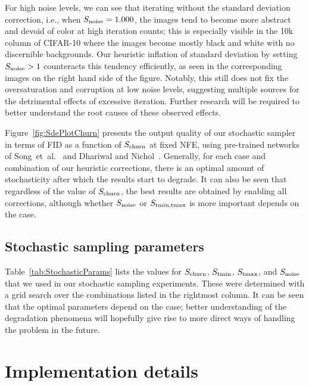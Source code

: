 For high noise levels, we can see that iterating without the standard deviation correction, i.e., when $S_\text{noise}=1.000$, the images tend to become more abstract and devoid of color at high iteration counts;
  this is especially visible in the 10k column of CIFAR-10 where the images become mostly black and white with no discernible backgrounds.
Our heuristic inflation of standard deviation by setting $S_\text{noise} > 1$ counteracts this tendency efficiently, as seen in the corresponding images on the right hand side of the figure.
Notably, this still does not fix the oversaturation and corruption at low noise levels, suggesting multiple sources for the detrimental effects of excessive iteration.
Further research will be required to better understand the root causes of these observed effects.

\figSdePlotChurn

Figure~\ref{fig:SdePlotChurn} presents the output quality of our stochastic sampler in terms of FID as a function of $S_\text{churn}$ at fixed NFE,
  using pre-trained networks of Song~et~al.~\cite{Song2021sde} and Dhariwal and Nichol~\cite{Dhariwal2021}.
Generally, for each case and combination of our heuristic corrections, there is an optimal amount of stochasticity after which the results start to degrade.
It can also be seen that regardless of the value of $S_\text{churn}$, the best results are obtained by enabling all corrections, although whether $S_\text{noise}$ or $S_\text{tmin,tmax}$ is more important depends on the case.

\subsection{\texorpdfstring{{Stochastic sampling parameters}}{Stochastic sampling parameters}}
\label{app:stochasticparams}

\tabStochasticParams

Table~\ref{tab:StochasticParams} lists {the values for $S_\text{churn}$, $S_\text{tmin}$, $S_\text{tmax}$, and $S_\text{noise}$ that we used in our stochastic sampling experiments}.
These were determined with a grid search over the combinations listed in the rightmost column.
It can be seen that the optimal parameters depend on the case;
  better understanding of the degradation phenomena will hopefully give rise to more direct ways of handling the problem in the future.

\section{Implementation details}
\label{app:implementation}

